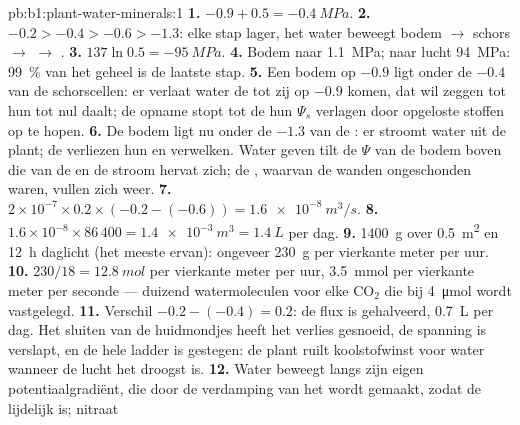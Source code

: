 \begin{solution}{pb:b1:plant-water-minerals:1}
\textbf{1.} $-0.9 + 0.5 = \qty{-0.4}{MPa}$.
\textbf{2.} $-0.2 > -0.4 > -0.6 > -1.3$: elke stap lager, het water beweegt
bodem $\to$ schors $\to$  $\to$ .
\textbf{3.} $137\ln 0.5 = \qty{-95}{MPa}$.
\textbf{4.} Bodem naar  \qty{1.1}{MPa};  naar lucht \qty{94}{MPa}:
\qty{99}{\%} van het geheel is de laatste stap.
\textbf{5.} Een bodem op $-0.9$ ligt onder de $-0.4$ van de schorscellen:
er verlaat water de  tot zij op $-0.9$ komen, dat wil zeggen tot hun
 tot nul daalt; de opname stopt tot de  hun $\Psi_s$ verlagen
door opgeloste stoffen op te hopen.
\textbf{6.} De bodem ligt nu onder de $-1.3$ van de : er stroomt
water uit de plant; de  verliezen hun  en verwelken. Water
geven tilt de $\Psi$ van de bodem boven die van de  en de stroom
hervat zich; de , waarvan de wanden ongeschonden waren, vullen zich
weer.
\textbf{7.} $2\times 10^{-7}\times 0.2\times(-0.2 - (-0.6)) =
\qty{1.6e-8}{m^3/s}$.
\textbf{8.} $1.6\times 10^{-8}\times 86\,400 = \qty{1.4e-3}{m^3} =
\qty{1.4}{L}$ per dag.
\textbf{9.} \qty{1400}{g} over \qty{0.5}{m^2} en \qty{12}{h} daglicht (het
meeste ervan): ongeveer \qty{230}{g} per vierkante meter per uur.
\textbf{10.} $230/18 = \qty{12.8}{mol}$ per vierkante meter per uur, \qty{3.5}{mmol} per vierkante meter per seconde --- duizend watermoleculen voor elke $\mathrm{CO_2}$ die bij \qty{4}{\micro mol} wordt vastgelegd.
\textbf{11.} Verschil $-0.2 - (-0.4) = 0.2$: de flux is gehalveerd,
\qty{0.7}{L} per dag. Het sluiten van de huidmondjes heeft het verlies
gesnoeid, de spanning is verslapt, en de hele ladder is gestegen: de plant
ruilt koolstofwinst voor water wanneer de lucht het droogst is.
\textbf{12.} Water beweegt langs zijn eigen potentiaalgradiënt, die door de
verdamping van het  wordt gemaakt, zodat de  lijdelijk is; nitraat

\end{solution}
